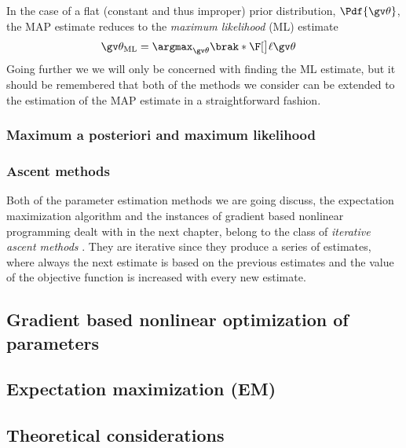 In the case of a flat (constant and thus improper)
prior distribution, $\Pdf{\Th}$, the MAP estimate reduces to the
\emph{maximum likelihood} (ML) estimate
\begin{align}
	\Th_{\text{ML}} &= \argmax_{\Th}\brak*\lLH
	\label{eq:ML}
\end{align}
Going further we we will only be concerned with finding the ML estimate, but it should
be remembered that both of the methods we consider can be extended
to the estimation of the MAP estimate in a straightforward fashion.


\subsubsection{Maximum a posteriori and maximum likelihood}

\subsubsection{Ascent methods}

Both of the parameter estimation methods we are going
discuss, the expectation maximization algorithm and
the instances of gradient based nonlinear programming dealt with in the
next chapter, belong to the class of \emph{iterative ascent methods} \parencite{luenberger2008}.
They are iterative since they produce a series of estimates, where
always the next estimate is based on the previous estimates and
the value of the objective function is increased with every new estimate.

\subsection{Gradient based nonlinear optimization of parameters}\label{sec:grad}%


\subsection{Expectation maximization (EM)}%


\subsection{Theoretical considerations}%



